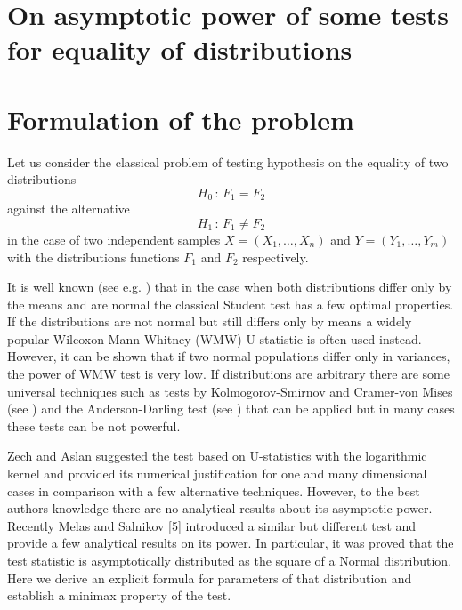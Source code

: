 \documentclass[final,11pt,3p]{elsarticle}
\begin{document}
\section*{{\Large On asymptotic power of some  tests for equality of  distributions}}


\section{Formulation of the problem}
\label{S:1}
Let us consider the classical problem of testing hypothesis on the equality of two distributions
\begin{equation}
  \label{H0}
  H_0\,:\,F_1 = F_2
\end{equation}
against the alternative
\begin{equation}
  \label{H1}
  H_1\,:\,F_1 \not= F_2
\end{equation}
in the case of two independent samples $X=(X_{1},\ldots, X_{n})$ and $Y=(Y_{1},\ldots, Y_{m})$ with the distributions functions $F_1$ and $F_2$ respectively.

It is well known (see e.g. \cite{Lehman1986}) that in the case when both distributions differ only by the means and are normal the classical Student test has a few optimal properties. If the distributions are not normal but still differs only by means a widely popular Wilcoxon-Mann-Whitney (WMW) U-statistic is often used instead. However, it can be shown that if two normal populations differ only in variances, the power of WMW test is very low.
If distributions are arbitrary there are some universal techniques such as tests by Kolmogorov-Smirnov and Cramer-von Mises  (see \cite{Buening2001}) and the Anderson-Darling test (see \cite{Anderson2011}) that can be applied but in many cases these tests can be not powerful.

Zech and Aslan  \cite{AslanZech2005} suggested the test based on U-statistics with the logarithmic kernel and provided its numerical justification for one and many dimensional cases in comparison with a few alternative techniques.  However, to the best authors knowledge there are no analytical results about its asymptotic power. Recently Melas and Salnikov [5] introduced a similar but different test and provide a few analytical results on its power. In particular, it was proved that the test statistic  is asymptotically distributed as the square of a Normal distribution. 
Here we derive an explicit formula for parameters of that distribution and establish a minimax property of the test.
\end{document}

